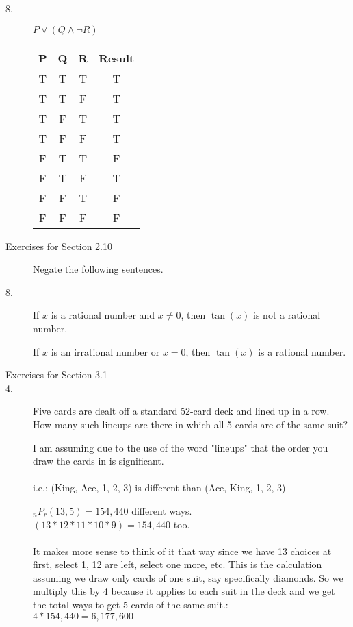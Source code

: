 \documentclass[10pt]{article}
\begin{document}
\begin{description}
\item[8.] $P \vee (Q \wedge \neg R)$

 \begin{tabular}{||c c c c||} 
 \hline
 P & Q & R & Result \\ [0.5ex] 
 \hline\hline
 T & T & T & T\\ 
 \hline
 T & T & F & T\\
 \hline
 T & F & T & T\\
 \hline
 T & F & F & T \\
 \hline
 F & T & T & F \\
 \hline
 F & T & F & T \\
 \hline
 F & F & T & F \\
 \hline
 F & F & F & F \\ [1ex] 
 \hline
\end{tabular}


\item[Exercises for Section 2.10]  Negate the following sentences.


\item[8.] If $x$ is a rational number and $x\not = 0$, then
  $\tan(x)$ is not a rational number.

If $x$ is an irrational number or $x = 0$, then
$\tan(x)$ is a rational number.
  

\item[Exercises for Section 3.1]

\item[4.]  Five cards are dealt off a standard 52-card deck and
  lined up in a row.  How many such lineups are there in
  which all 5 cards are of the same suit?

I am assuming due to the use of the word "lineups" that the order you draw the cards in is significant. \\\\
i.e.: (King, Ace, 1, 2, 3) is different than (Ace, King, 1, 2, 3) 

$_nP_r(13, 5) = 154,440$ different ways. \\ 
$(13 * 12 * 11 * 10 * 9) = 154,440$ too. \\\\
It makes more sense to think of it that way since we have 13 choices at first, 
select 1, 12 are left, select one more, etc. This is the calculation assuming we 
draw only cards of one suit, say specifically diamonds. So we multiply this 
by 4 because it applies to each suit in the deck and we get the total ways 
to get 5 cards of the same suit.: \\ $4 * 154,440 = 6,177,600$ \\



\end{description}
\end{document}
